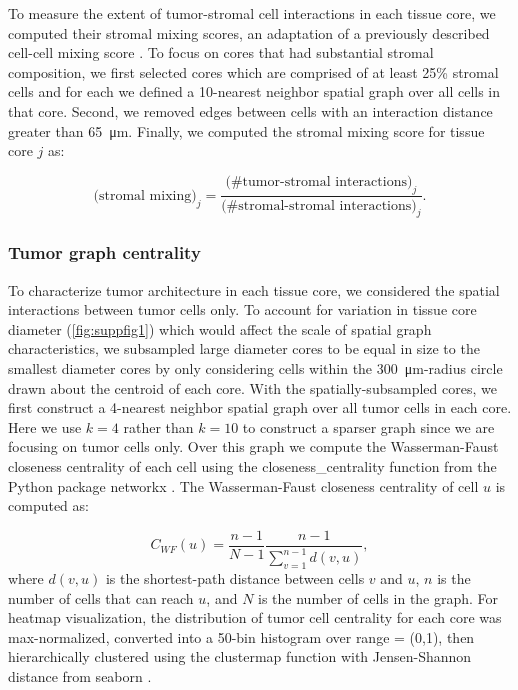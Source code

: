 \documentclass[preprint,review,3p,12pt]{elsarticle}
\begin{document}
To measure the extent of tumor-stromal cell interactions in each tissue core, we computed their stromal mixing scores, an adaptation of a previously described cell-cell mixing score \cite{keren2018}. To focus on cores that had substantial stromal composition, we first selected cores which are comprised of at least 25\% stromal cells and for each we defined a 10-nearest neighbor spatial graph over all cells in that core. Second, we removed edges between cells with an interaction distance greater than \SI{65}{\micro\meter}. Finally, we computed the stromal mixing score for tissue core $j$ as:

\begin{equation}
\label{eq:sm}
\text{(stromal mixing)}_{j} = \frac{\text{(\# tumor-stromal interactions)}_{j}}{\text{(\# stromal-stromal interactions)}_{j}}.
\end{equation}

\subsubsection{Tumor graph centrality}
To characterize tumor architecture in each tissue core, we considered the spatial interactions between tumor cells only. To account for variation in tissue core diameter (\autoref{fig:suppfig1}) which would affect the scale of spatial graph characteristics, we subsampled large diameter cores to be equal in size to the smallest diameter cores by only considering cells within the \SI{300}{\micro\meter}-radius circle drawn about the centroid of each core. With the spatially-subsampled cores, we first construct a 4-nearest neighbor spatial graph over all tumor cells in each core. Here we use $k=4$ rather than $k=10$ to construct a sparser graph since we are focusing on tumor cells only. Over this graph we compute the Wasserman-Faust closeness centrality of each cell using the closeness\_centrality function from the Python package networkx \cite{networkx2008}. The Wasserman-Faust closeness centrality of cell $u$ is computed as:

\begin{equation}
\label{eq:cc}
C_{WF}(u) = \frac{n-1}{N-1} \frac{n - 1}{\sum_{v=1}^{n-1} d(v, u)},
\end{equation}
where $d(v,u)$ is the shortest-path distance between cells $v$ and $u$, $n$ is the number of cells that can reach $u$, and $N$ is the number of cells in the graph. For heatmap visualization, the distribution of tumor cell centrality for each core was max-normalized, converted into a 50-bin histogram over range = (0,1), then hierarchically clustered using the clustermap function with Jensen-Shannon distance from seaborn \cite{seaborn2020}.
\end{document}
